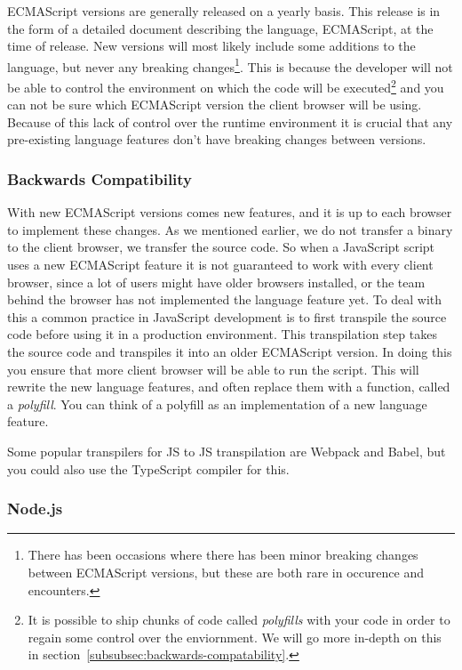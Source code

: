 ECMAScript versions are generally released on a yearly basis.
This release is in the form of a detailed document describing the language, ECMAScript, at the time of release.
New versions will most likely include some additions to the language, but never any breaking changes\footnote{There has been occasions where there has been minor breaking changes between ECMAScript versions, but these are both rare in occurence and encounters.}.
This is because the developer will not be able to control the environment on which the code will be executed\footnote{It is possible to ship chunks of code called \textit{polyfills} with your code in order to regain some control over the enviornment. We will go more in-depth on this in section~\vref{subsubsec:backwards-compatability}.} and you can not be sure which ECMAScript version the client browser will be using.
Because of this lack of control over the runtime environment it is crucial that any pre-existing language features don't have breaking changes between versions.

\subsubsection{Backwards Compatibility}\label{subsubsec:backwards-compatability}

With new ECMAScript versions comes new features, and it is up to each browser to implement these changes.
As we mentioned earlier, we do not transfer a binary to the client browser, we transfer the source code.
So when a JavaScript script uses a new ECMAScript feature it is not guaranteed to work with every client browser, since a lot of users might have older browsers installed, or the team behind the browser has not implemented the language feature yet.
To deal with this a common practice in JavaScript development is to first transpile the source code before using it in a production environment.
This transpilation step takes the source code and transpiles it into an older ECMAScript version.
In doing this you ensure that more client browser will be able to run the script.
This will rewrite the new language features, and often replace them with a function, called a \textit{polyfill}.
You can think of a polyfill as an implementation of a new language feature.

Some popular transpilers for JS to JS transpilation are Webpack and Babel, but you could also use the TypeScript compiler for this.

\subsubsection{Node.js}

